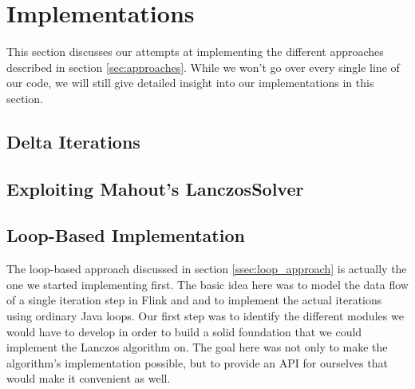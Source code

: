 \section{Implementations}


This section discusses our attempts at implementing the different approaches
described in section \ref{sec:approaches}. While we won't go over every single
line of our code, we will still give detailed insight into our implementations
in this section.

\subsection{Delta Iterations}

\subsection{Exploiting Mahout's LanczosSolver}



\subsection{Loop-Based Implementation}

The loop-based approach discussed in section \ref{ssec:loop_approach} is
actually the one we started implementing first. The basic idea here was to
model the data flow of a single iteration step in Flink and and to implement
the actual iterations using ordinary Java loops. Our first step was to identify
the different modules we would have to develop in order to build a solid
foundation that we could implement the Lanczos algorithm on. The goal here was
not only to make the algorithm's implementation possible, but to provide an API
for ourselves that would make it convenient as well.


